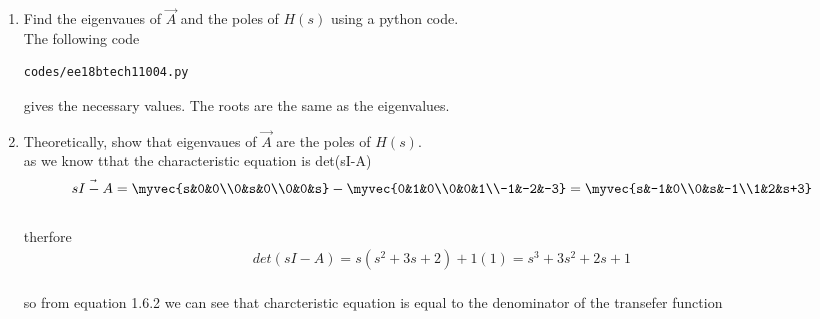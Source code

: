 \begin{enumerate}[label=\thesubsection.\arabic*.,ref=\thesubsection.\theenumi]
\item Find the eigenvaues of $\vec{A}$ and the poles of $H(s)$ using a python code.
\\
\solution The following code 
%
\begin{lstlisting}
codes/ee18btech11004.py
\end{lstlisting}
gives the necessary values.  The roots are the same as the eigenvalues.
%
\item Theoretically, show that eigenvaues of $\vec{A}$ are the poles of  $H(s)$.
\solution 
\\ as we know tthat  the characteristic equation is det(sI-A) 
\\\begin{align}
\vec{sI-A}=
\myvec{s&0&0\\0&s&0\\0&0&s}
-
\myvec{0&1&0\\0&0&1\\-1&-2&-3}
=\myvec{s&-1&0\\0&s&-1\\1&2&s+3}
\end{align}
\\therfore
\begin{align}
det(sI-A)=s(s^2+3s+2)+1(1)=s^3+3s^2+2s+1
\end{align} 
\\so from equation 1.6.2 we can see that charcteristic equation is equal to the denominator of the transefer function
\end{enumerate}

